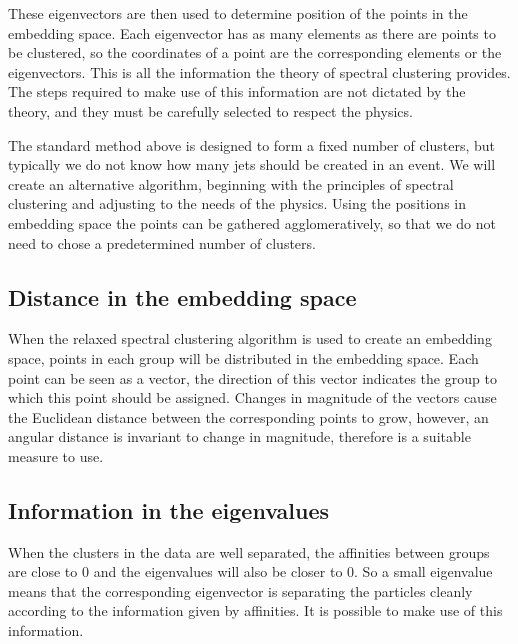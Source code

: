 These eigenvectors are then used to determine position of the points in the embedding space.
Each eigenvector has as many elements as there are points to be clustered,
so the coordinates of a point are the corresponding elements or the eigenvectors.
This is all the information the theory of spectral clustering provides.
The steps required to make use of this information are not dictated by the theory,
and they must be carefully selected to respect the physics.

The standard method above is designed to form a fixed number of clusters,
but typically we do not know how many jets should be created in an event.
We will create an alternative algorithm, beginning with the principles of
spectral clustering and adjusting to the needs of the physics.
Using the positions in embedding space the points can be gathered agglomeratively,
so that we do not need to chose a predetermined number of clusters.

\subsection{Distance in the embedding space}\label{sec:embedding_distance}
When the relaxed spectral clustering algorithm is used to create an embedding space,
points in each group will be distributed in the embedding space. %
Each point can be seen as a vector, the direction of this vector indicates the group to which this point should be assigned.
Changes in magnitude of the vectors cause the Euclidean distance between the corresponding points to grow,
however, an angular distance is invariant to change in magnitude,
 therefore is a suitable measure to use.

\subsection{Information in the eigenvalues}\label{sec:eig_norm}
When the clusters in the data are well separated,
the affinities between groups are close to \(0\)
and the eigenvalues will also be closer to \(0\).
So a small eigenvalue means that the corresponding eigenvector
is separating the particles cleanly according to the information given by affinities.
It is possible to make use of this information.

